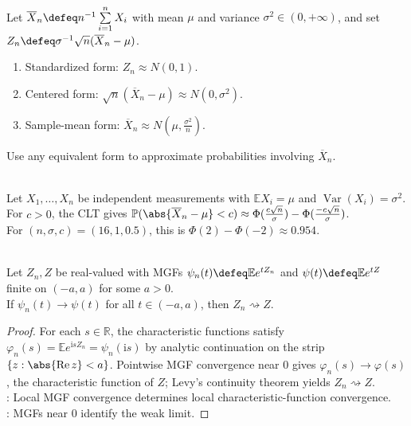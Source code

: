 \begin{method} \label{meth:clt-normal-approximation-forms} \\
Let $\overline{X}_n\defeq n^{-1}\sum\limits_{i=1}^{n}X_i$ with mean $\mu$ and variance $\sigma^2\in(0,+\infty)$, and set $Z_n\defeq\sigma^{-1}\sqrt{n}(\overline{X}_n-\mu)$.
\begin{enumerate}[label=(\roman*)]
\setlength{\itemsep}{0pt}
\item Standardized form: $Z_n\approx N(0,1)$.
\item Centered form: $\sqrt{n}(\overline{X}_n-\mu)\approx N(0,\sigma^2)$.
\item Sample-mean form: $\overline{X}_n\approx N(\mu,\frac{\sigma^2}{n})$.
\end{enumerate}
Use any equivalent form to approximate probabilities involving $\overline{X}_n$.
\end{method}

\begin{example} \label{ex:clt-measurement-error-interval} \\
Let $X_1,\ldots,X_n$ be independent measurements with $\mathbb{E}X_i=\mu$ and $\operatorname{Var}(X_i)=\sigma^2$.\\
For $c>0$, the CLT gives $\mathbb{P}(\abs{\overline{X}_n-\mu}<c)\approx\Phi(\frac{c\sqrt{n}}{\sigma})-\Phi(\frac{-c\sqrt{n}}{\sigma})$.\\
For $(n,\sigma,c)=(16,1,0.5)$, this is $\Phi(2)-\Phi(-2)\approx0.954$.
\end{example}

\begin{lemma} \label{lem:mgf-convergence-criterion} \\
Let $Z_n,Z$ be real-valued with MGFs $\psi_n(t)\defeq\mathbb{E}e^{tZ_n}$ and $\psi(t)\defeq\mathbb{E}e^{tZ}$ finite on $(-a,a)$ for some $a>0$.\\
If $\psi_n(t)\to\psi(t)$ for all $t\in(-a,a)$, then $Z_n\rightsquigarrow Z$.
\begin{proof}
For each $s\in\mathbb{R}$, the characteristic functions satisfy $\varphi_n(s)=\mathbb{E}e^{\mathrm{i}sZ_n}=\psi_n(\mathrm{i}s)$ by analytic continuation on the strip $\{z:\abs{\operatorname{Re}z}<a\}$. Pointwise MGF convergence near $0$ gives $\varphi_n(s)\to\varphi(s)$, the characteristic function of $Z$; Levy's continuity theorem yields $Z_n\rightsquigarrow Z$.\\
: Local MGF convergence determines local characteristic-function convergence.\\
: MGFs near $0$ identify the weak limit.
\end{proof}
\end{lemma}

